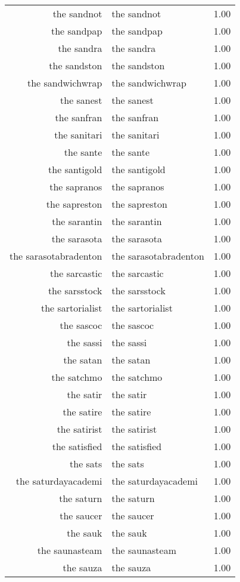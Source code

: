 \begin{table}[ht]
\begin{tabular}{rlr}
  the sandnot & the sandnot & 1.00 \\ 
  the sandpap & the sandpap & 1.00 \\ 
  the sandra & the sandra & 1.00 \\ 
  the sandston & the sandston & 1.00 \\ 
  the sandwichwrap & the sandwichwrap & 1.00 \\ 
  the sanest & the sanest & 1.00 \\ 
  the sanfran & the sanfran & 1.00 \\ 
  the sanitari & the sanitari & 1.00 \\ 
  the sante & the sante & 1.00 \\ 
  the santigold & the santigold & 1.00 \\ 
  the sapranos & the sapranos & 1.00 \\ 
  the sapreston & the sapreston & 1.00 \\ 
  the sarantin & the sarantin & 1.00 \\ 
  the sarasota & the sarasota & 1.00 \\ 
  the sarasotabradenton & the sarasotabradenton & 1.00 \\ 
  the sarcastic & the sarcastic & 1.00 \\ 
  the sarsstock & the sarsstock & 1.00 \\ 
  the sartorialist & the sartorialist & 1.00 \\ 
  the sascoc & the sascoc & 1.00 \\ 
  the sassi & the sassi & 1.00 \\ 
  the satan & the satan & 1.00 \\ 
  the satchmo & the satchmo & 1.00 \\ 
  the satir & the satir & 1.00 \\ 
  the satire & the satire & 1.00 \\ 
  the satirist & the satirist & 1.00 \\ 
  the satisfied & the satisfied & 1.00 \\ 
  the sats & the sats & 1.00 \\ 
  the saturdayacademi & the saturdayacademi & 1.00 \\ 
  the saturn & the saturn & 1.00 \\ 
  the saucer & the saucer & 1.00 \\ 
  the sauk & the sauk & 1.00 \\ 
  the saunasteam & the saunasteam & 1.00 \\ 
  the sauza & the sauza & 1.00 \\ 

\end{tabular}
\end{table}
